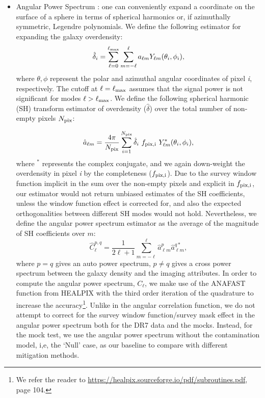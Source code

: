 \documentclass[fleqn, usenatbib]{mnras}
\begin{document}
\begin{itemize}
    \item Angular Power Spectrum : one can conveniently expand a coordinate on the surface of a sphere in terms of spherical harmonics or, if azimuthally symmetric, Legendre polynomials. We define the following estimator for expanding the galaxy overdensity:
    \begin{equation}
        \hat{\delta}_{i} = \sum_{\ell=0}^{\ell_{{\rm max}}}\sum_{m=-\ell}^{\ell} a_{\ell m} Y_{\ell m}(\theta_{i}, \phi_{i}),
    \end{equation}
    where $\theta, \phi$ represent the polar and azimuthal angular coordinates of pixel \textit{i}, respectively. The cutoff at $\ell=\ell_{{\rm max}}$ assumes that the signal power is not significant for modes $\ell>\ell_{{\rm max}}$. We define the following spherical harmonic (SH) transform estimator of overdensity ($\hat{\delta}$) over the total number of non-empty pixels $N_{{\rm pix}}$:
   
    \begin{equation}
        \hat{a}_{\ell m} = \frac{4\pi}{N_{{\rm pix}}} \sum_{i=1}^{N_{{\rm pix}}}  \hat{\delta}_{i}~f_{\rm pix, i}~ Y^{*}_{\ell m}(\theta_{i}, \phi_{i}),
    \end{equation}
    where $^{*}$ represents the complex conjugate, and we again down-weight the overdensity in pixel \textit{i} by the completeness ($f_{\rm pix, i}$). Due to the survey window function implicit in the sum over the non-empty pixels and explicit in $f_{\rm pix, i}$, our estimator would not return unbiased estimates of the SH coefficients, unless the window function effect is corrected for, and also the expected orthogonalities between different SH modes would not hold. Nevertheless, we define the angular power spectrum estimator as the average of the magnitude of SH coefficients over $m$:
    \begin{equation}
        \hat{C}^{p,q}_{\ell} = \frac{1}{2\ell +1} \sum_{m=-\ell}^{\ell} \hat{a}^{p}_{\ell m} \hat{a}^{q*}_{\ell m},
    \end{equation}
    where $p=q$ gives an auto power spectrum, $p\neq q$ gives a cross power spectrum between the galaxy density and the imaging attributes. In order to compute the angular power spectrum, $C_{\ell}$, we make use of the ANAFAST function from HEALPIX \citep{gorski2005healpix} with the third order iteration of the quadrature to increase the accuracy\footnote{We refer the reader to \url{https://healpix.sourceforge.io/pdf/subroutines.pdf}, page 104.}. 
    Unlike in the angular correlation function, we do not attempt to correct for the survey window function/survey mask effect in the angular power spectrum both for the DR7 data and the mocks. Instead, for the mock test, we use the angular power spectrum without the contamination model, i,e, the `Null' case, as our baseline to compare with different mitigation methods.\\ 
    

\end{itemize}
\end{document}
